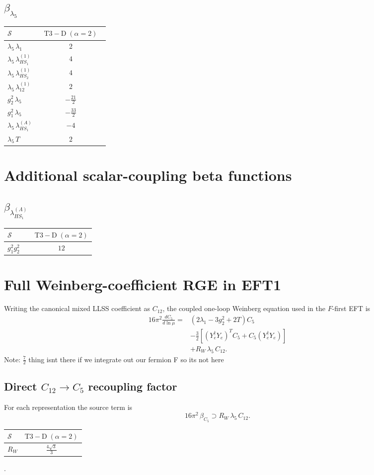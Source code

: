 \documentclass[9pt]{article}
\begin{document}
\subsection*{$ \beta_{\lambda_5} $}
\begin{longtable}{@{}p{0.31\linewidth}c@{}}
\toprule
$\mathcal{S}$ & $ \mathrm{T3-D}\;(\alpha=2) $ \\
\midrule
$ \lambda_5\,\lambda_1 $ & $ 2 $ \\
$ \lambda_5\,\lambda_{HS_1}^{(1)} $ & $ 4 $ \\
$ \lambda_5\,\lambda_{HS_2}^{(1)} $ & $ 4 $ \\
$ \lambda_5\,\lambda_{12}^{(1)} $ & $ 2 $ \\
$ g_2^2\,\lambda_5 $ & $ - \frac{21}{2} $ \\
$ g_1^2\,\lambda_5 $ & $ - \frac{33}{2} $ \\
$ \lambda_5\,\lambda_{HS_1}^{(A)} $ & $ -4 $ \\
$ \lambda_5\,T $ & $ 2 $ \\
\bottomrule
\end{longtable}
\section*{Additional scalar-coupling beta functions}
\subsection*{$ \beta_{\lambda_{HS_1}^{(A)}} $}
\begin{longtable}{@{}p{0.31\linewidth}c@{}}
\toprule
$\mathcal{S}$ & $ \mathrm{T3-D}\;(\alpha=2) $ \\
\midrule
$ g_1^2g_2^2 $ & $ 12 $ \\
\bottomrule
\end{longtable}

\section*{Full Weinberg-coefficient RGE in EFT1}
Writing the canonical mixed LLSS coefficient as $C_{12}$, the coupled one-loop Weinberg equation used in the $F$-first EFT is
\begin{align}
16\pi^2\frac{dC_5}{d\ln\mu}={}&(2\lambda_1-3g_2^2+2T)C_5\\
&-\frac32\left[(Y_e^\dagger Y_e)^T C_5+C_5(Y_e^\dagger Y_e)\right]\\
&+R_W\,\lambda_5\,C_{12}.
\end{align}
Note: $\frac{7}{2}$ thing isnt there if we integrate out our fermion F so its not here \subsection*{Direct $C_{12}\to C_5$ recoupling factor}
For each representation the source term is
\[16\pi^2\,\beta_{C_5}\supset R_W\,\lambda_5\,C_{12}.\]
\begin{longtable}{@{}lc@{}}
\toprule
$\mathcal{S}$ & $ \mathrm{T3-D}\;(\alpha=2) $ \\
\midrule
$R_W$ & $ \frac{4 \sqrt{3}}{3} $ \\
\bottomrule
\end{longtable}
.
\end{document}
